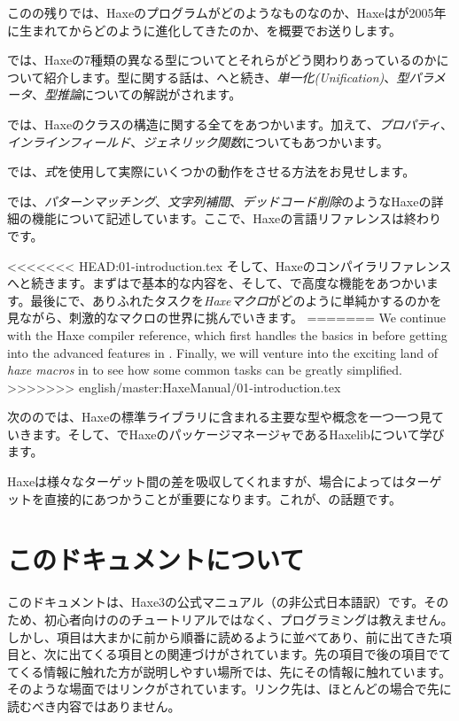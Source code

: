 このの残りでは、Haxeのプログラムがどのようなものなのか、Haxeはが2005年に生まれてからどのように進化してきたのか、を概要でお送りします。

では、Haxeの7種類の異なる型についてとそれらがどう関わりあっているのかについて紹介します。型に関する話は、へと続き、\emph{単一化(Unification)}、\emph{型パラメータ}、\emph{型推論}についての解説がされます。

では、Haxeのクラスの構造に関する全てをあつかいます。加えて、\emph{プロパティ}、\emph{インラインフィールド}、\emph{ジェネリック関数}についてもあつかいます。

では、\emph{式}を使用して実際にいくつかの動作をさせる方法をお見せします。

では、\emph{パターンマッチング}、\emph{文字列補間}、\emph{デッドコード削除}のようなHaxeの詳細の機能について記述しています。ここで、Haxeの言語リファレンスは終わりです。

<<<<<<< HEAD:01-introduction.tex
そして、Haxeのコンパイラリファレンスへと続きます。まずはで基本的な内容を、そして、で高度な機能をあつかいます。最後にで、ありふれたタスクを\emph{Haxeマクロ}がどのように単純かするのかを見ながら、刺激的なマクロの世界に挑んでいきます。
=======
We continue with the Haxe compiler reference, which first handles the basics in  before getting into the advanced features in . Finally, we will venture into the exciting land of \emph{haxe macros} in  to see how some common tasks can be greatly simplified.
>>>>>>> english/master:HaxeManual/01-introduction.tex

次ののでは、Haxeの標準ライブラリに含まれる主要な型や概念を一つ一つ見ていきます。そして、でHaxeのパッケージマネージャであるHaxelibについて学びます。

Haxeは様々なターゲット間の差を吸収してくれますが、場合によってはターゲットを直接的にあつかうことが重要になります。これが、の話題です。

\section{このドキュメントについて}
\label{introduction-about-this-document}

このドキュメントは、Haxe3の公式マニュアル（の非公式日本語訳）です。そのため、初心者向けののチュートリアルではなく、プログラミングは教えません。しかし、項目は大まかに前から順番に読めるように並べてあり、前に出てきた項目と、次に出てくる項目との関連づけがされています。先の項目で後の項目でててくる情報に触れた方が説明しやすい場所では、先にその情報に触れています。そのような場面ではリンクがされています。リンク先は、ほとんどの場合で先に読むべき内容ではありません。

